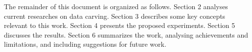 
The remainder of this document is organized as follows.
    Section 2 analyses current researches on data carving. 
    Section 3 describes some key concepts relevant to this work. 
    Section 4 presents the proposed experiments.
    Section 5 discusses the results.
    Section 6 summarizes the work, analysing achievements and limitations, and including suggestions for future work.
